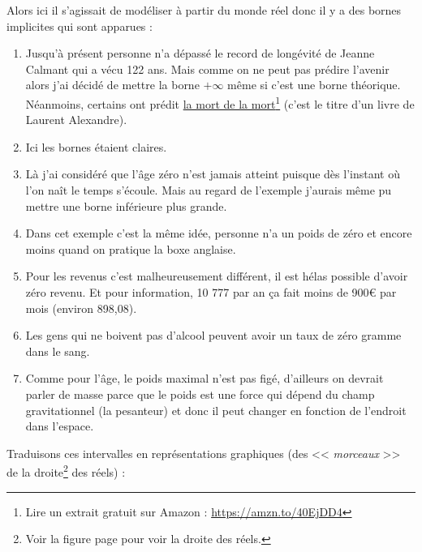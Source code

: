 \documentclass[a4paper,11pt]{book}
\begin{document}
Alors ici il s'agissait de modéliser à partir du monde réel donc il
y a des bornes implicites qui sont apparues :

\begin{enumerate}
\item Jusqu'à présent personne n'a dépassé le record de longévité de
Jeanne Calmant qui a vécu 122 ans. Mais comme on ne peut pas
prédire l'avenir alors j'ai décidé de mettre la borne
\(+\infty\) même si c'est une borne théorique. Néanmoins, certains
ont prédit \href{https://amzn.to/3OKi2os}{la mort de la mort}\footnote{Lire un extrait gratuit sur Amazon :
\url{https://amzn.to/40EjDD4}} (c'est le titre d'un
livre de Laurent Alexandre).
\item Ici les bornes étaient claires.
\item Là j'ai considéré que l'âge zéro n'est jamais atteint puisque dès
l'instant où l'on naît le temps s'écoule. Mais au regard de
l'exemple j'aurais même pu mettre une borne
inférieure plus grande.
\item Dans cet exemple c'est la même idée, personne n'a un poids de zéro
et encore moins quand on pratique la boxe anglaise.
\item Pour les revenus c'est malheureusement différent, il est hélas
possible d'avoir zéro revenu. Et pour information, 10 777 par an ça
fait moins de 900€ par mois (environ 898,08).
\item Les gens qui ne boivent pas d'alcool peuvent avoir un taux de zéro
gramme dans le sang.
\item Comme pour l'âge, le poids maximal n'est pas figé, d'ailleurs on
devrait parler de masse parce que le poids est une force qui dépend
du champ gravitationnel (la pesanteur) et donc il peut changer en
fonction de l'endroit dans l'espace.
\end{enumerate}


Traduisons ces intervalles en représentations
graphiques (des << \emph{morceaux} >> de la droite\footnote{Voir la figure page \pageref{page:real-line} pour voir
la droite des réels.} des
réels) :
\end{document}
